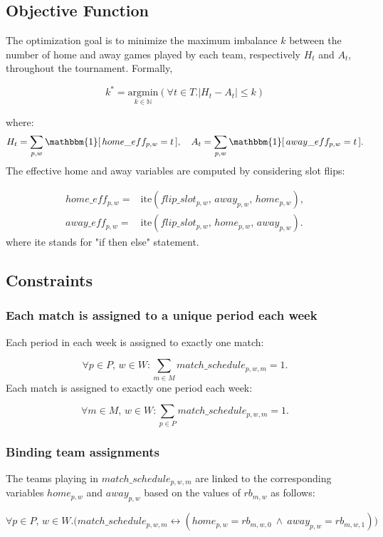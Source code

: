 \subsection{Objective Function}

The optimization goal is to minimize the maximum imbalance $k$ between the number of home and away games played by each team, respectively $H_t$ and $A_t$, throughout the tournament. Formally,

\[
k^* = \underset{k \in \mathbb{N}}{\text{argmin}} \left( \forall t \in T. |H_t - A_t| \leq k \right)
\]

where:
\[
H_t = \sum_{p,w} \mathbbm{1}[\,home\_eff_{p,w} = t\,], 
\quad
A_t = \sum_{p,w} \mathbbm{1}[\,away\_eff_{p,w} = t\,].
\]
The effective home and away variables are computed by considering slot flips:

\begin{align*}
home\_eff_{p,w} =& \text{ite}(flip\_slot_{p,w},\, away_{p,w},\, home_{p,w}), \\
away\_eff_{p,w} =& \text{ite}(flip\_slot_{p,w},\, home_{p,w},\, away_{p,w}).
\end{align*}
where ite stands for "if then else" statement.

\subsection{Constraints}

\subsubsection{Each match is assigned to a unique period each week}

Each period in each week is assigned to exactly one match:

\[
\forall p \in P,\, w \in W: 
\sum_{m \in M} match\_schedule_{p,w,m} = 1.
\]
Each match is assigned to exactly one period each week:

\[
\forall m \in M,\, w \in W: 
\sum_{p \in P} match\_schedule_{p,w,m} = 1.
\]

\subsubsection{Binding team assignments}
The teams playing in $match\_schedule_{p, w, m}$ are linked to the corresponding variables $home_{p, w}$ and $away_{p, w}$ based on the values of $rb_{m, w}$ as follows:

$$
\forall p \in P,\, w \in W.(match\_schedule_{p,w,m} \leftrightarrow (home_{p,w} = rb_{m,w,0} \ \wedge \ away_{p,w} = rb_{m,w,1})
\big)
$$

